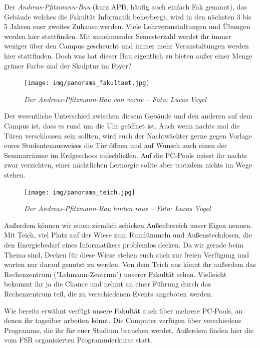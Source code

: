 
Der \emph{Andreas-Pfitzmann-Bau} (kurz APB, häufig auch einfach \glqq{}Fak\grqq{} genannt), das Gebäude welches die Fakultät Informatik beherbergt, wird in den nächsten 3 bis 5 Jahren euer zweites Zuhause werden.
Viele Lehrveranstaltungen und Übungen werden hier stattfinden. Mit zunehmender Semesterzahl werdet ihr immer weniger über den Campus gescheucht und immer mehr Veranstaltungen werden hier stattfinden.
Doch was hat dieser Bau eigentlich zu bieten außer einer Menge grüner Farbe und der Skulptur im Foyer?

\begin{figure}[h!]
\centering
\texttt{[image: img/panorama\_fakultaet.jpg]}
\caption*{\small \textit{Der Andreas-Pfitzmann-Bau von vorne -- Foto: Lucas Vogel}}
\end{figure}

Der wesentliche Unterschied zwischen diesem Gebäude und den anderen auf dem Campus ist, dass es rund um die Uhr geöffnet ist. Auch wenn nachts mal die Türen verschlossen sein sollten, wird euch der Nachtwächter gerne gegen Vorlage eures Studentenausweises die Tür öffnen und auf Wunsch auch einen der Seminarräume im Erdgeschoss aufschließen. 
Auf die PC-Pools müsst ihr nachts zwar verzichten, einer nächtlichen Lernorgie sollte aber trotzdem nichts im Wege stehen.

\begin{figure}[h!]
\centering
\texttt{[image: img/panorama\_teich.jpg]}
\caption*{\small \textit{Der Andreas-Pfitzmann-Bau hinten raus -- Foto: Lucas Vogel}}
\end{figure}

Außerdem können wir einen ziemlich schicken Außenbereich unser Eigen nennen. Mit Teich, viel Platz auf der Wiese zum Rumlümmeln und Außensteckdosen, die den Energiebedarf eines Informatikers problemlos decken. Da wir gerade beim Thema sind, Decken für diese Wiese stehen euch auch zur freien Verfügung und warten nur darauf genutzt zu werden.
Von dem Teich aus könnt ihr außerdem das Rechenzentrum ("Lehmann-Zentrum") unserer Fakultät sehen. Vielleicht bekommt ihr ja die Chance und nehmt an einer Führung durch das Rechenzentrum teil, die zu verschiedenen Events angeboten werden.

Wie bereits erwähnt verfügt unsere Fakultät auch über mehrere PC-Pools, an denen ihr tagsüber arbeiten könnt. Die Computer verfügen über verschiedene Programme, die ihr für euer Studium brauchen werdet. Außerdem finden hier die vom FSR organisierten Programmierkurse statt.

